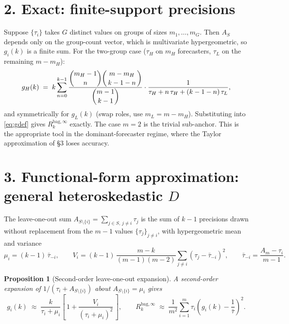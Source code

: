 \documentclass[11pt]{article}
\newcommand{\Rk}{R_k^{\mathrm{bag},\infty}}
\newtheorem{proposition}{Proposition}
\begin{document}
\section*{2. Exact: finite-support precisions}

Suppose $\{\tau_i\}$ takes $G$ distinct values on groups of sizes $m_1,\dots,m_G$.
Then $A_S$ depends only on the group-count vector, which is multivariate hypergeometric,
so $g_i(k)$ is a finite sum. For the two-group case
($\tau_H$ on $m_H$ forecasters, $\tau_L$ on the remaining $m-m_H$):
\begin{equation}\label{eq:twogroup}
  g_H(k)\;=\;k\sum_{n=0}^{k-1}
  \frac{\dbinom{m_H-1}{n}\dbinom{m-m_H}{\,k-1-n\,}}{\dbinom{m-1}{k-1}}
  \cdot\frac{1}{\tau_H+n\,\tau_H+(k-1-n)\,\tau_L},
\end{equation}
and symmetrically for $g_L(k)$ (swap roles, use $m_L=m-m_H$). Substituting into
\eqref{eq:gdef} gives $\Rk$ exactly. The case $m=2$ is the trivial sub-anchor.
This is the appropriate tool in the dominant-forecaster regime, where the
Taylor approximation of \S3 loses accuracy.

\section*{3. Functional-form approximation: general heteroskedastic $D$}

The leave-one-out sum $A_{S\setminus\{i\}}=\sum_{j\in S,\,j\neq i}\tau_j$ is the sum of
$k-1$ precisions drawn without replacement from the $m-1$ values $\{\tau_j\}_{j\neq i}$,
with hypergeometric mean and variance
\begin{equation}\label{eq:loo-moments}
  \mu_i=(k-1)\,\bar\tau_{-i},
  \qquad
  V_i=(k-1)\,\frac{m-k}{(m-1)(m-2)}\sum_{j\neq i}(\tau_j-\bar\tau_{-i})^2,
  \qquad
  \bar\tau_{-i}=\frac{A_m-\tau_i}{m-1}.
\end{equation}

\begin{proposition}[Second-order leave-one-out expansion]\label{prop:mf2}
A second-order expansion of $1/(\tau_i+A_{S\setminus\{i\}})$ about $A_{S\setminus\{i\}}=\mu_i$ gives
\begin{equation}\label{eq:mf2}
  \boxed{\;
  g_i(k)\;\approx\;\frac{k}{\tau_i+\mu_i}
  \left[\,1+\frac{V_i}{(\tau_i+\mu_i)^2}\,\right],
  \qquad
  \Rk\;\approx\;\frac{1}{m^2}\sum_{i=1}^m \tau_i\!\left(g_i(k)-\frac{1}{\bar\tau}\right)^{\!2}.
  \;}
\end{equation}
\end{proposition}
\end{document}
